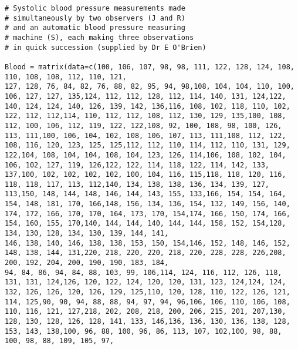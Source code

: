 \begin{verbatim}
# Systolic blood pressure measurements made 
# simultaneously by two observers (J and R) 
# and an automatic blood pressure measuring
# machine (S), each making three observations 
# in quick succession (supplied by Dr E O'Brien)

Blood = matrix(data=c(100, 106, 107, 98, 98, 111, 122, 128, 124, 108, 110, 108, 108, 112, 110, 121, 
127, 128, 76, 84, 82, 76, 88, 82, 95, 94, 98,108, 104, 104, 110, 100, 106, 127, 127, 135,124, 112, 112, 128, 112, 114, 140, 131, 124,122, 140, 124, 124, 140, 126, 139, 142, 136,116, 108, 102, 118, 110, 102, 122, 112, 112,114, 110, 112, 112, 108, 112, 130, 129, 135,100, 108, 112, 100, 106, 112, 119, 122, 122,108, 92, 100, 108, 98, 100, 126, 113, 111,100, 106, 104, 102, 108, 106, 107, 113, 111,108, 112, 122, 108, 116, 120, 123, 125, 125,112, 112, 110, 114, 112, 110, 131, 129, 122,104, 108, 104, 104, 108, 104, 123, 126, 114,106, 108, 102, 104, 106, 102, 127, 119, 126,122, 122, 114, 118, 122, 114, 142, 133, 137,100, 102, 102, 102, 102, 100, 104, 116, 115,118, 118, 120, 116, 118, 118, 117, 113, 112,140, 134, 138, 138, 136, 134, 139, 127, 113,150, 148, 144, 148, 146, 144, 143, 155, 133,166, 154, 154, 164, 154, 148, 181, 170, 166,148, 156, 134, 136, 154, 132, 149, 156, 140,
174, 172, 166, 170, 170, 164, 173, 170, 154,174, 166, 150, 174, 166, 154, 160, 155, 170,140, 144, 144, 140, 144, 144, 158, 152, 154,128, 134, 130, 128, 134, 130, 139, 144, 141,
146, 138, 140, 146, 138, 138, 153, 150, 154,146, 152, 148, 146, 152, 148, 138, 144, 131,220, 218, 220, 220, 218, 220, 228, 228, 226,208, 200, 192, 204, 200, 190, 190, 183, 184,
94, 84, 86, 94, 84, 88, 103, 99, 106,114, 124, 116, 112, 126, 118, 131, 131, 124,126, 120, 122, 124, 120, 120, 131, 123, 124,124, 124, 132, 126, 126, 120, 126, 129, 125,110, 120, 128, 110, 122, 126, 121, 114, 125,90, 90, 94, 88, 88, 94, 97, 94, 96,106, 106, 110, 106, 108, 110, 116, 121, 127,218, 202, 208, 218, 200, 206, 215, 201, 207,130, 128, 130, 128, 126, 128, 141, 133, 146,136, 136, 130, 136, 138, 128, 153, 143, 138,100, 96, 88, 100, 96, 86, 113, 107, 102,100, 98, 88, 100, 98, 88, 109, 105, 97,

\end{verbatim}
